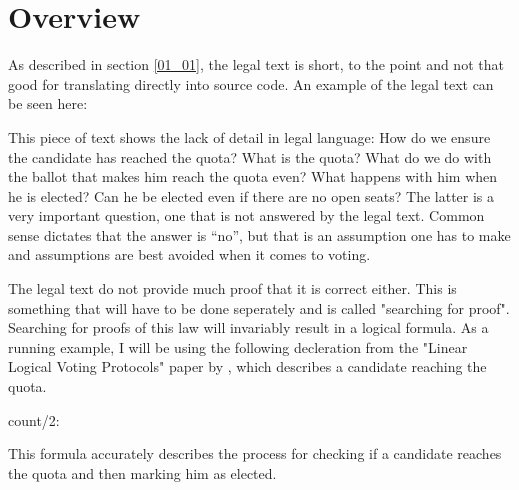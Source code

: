 \chapter{Overview}
\label{02}

As described in section \ref{01_01}, the legal text is short, to the point and not that good for translating directly into source code. An example of the legal text can be seen here:


This piece of text shows the lack of detail in legal language: How do we ensure the candidate has reached the quota? What is the quota? What do we do with the ballot that makes him reach the quota even? What happens with him when he is elected? Can he be elected even if there are no open seats? The latter is a very important question, one that is not answered by the legal text. Common sense dictates that the answer is “no”, but that is an assumption one has to make and assumptions are best avoided when it comes to voting.

The legal text do not provide much proof that it is correct either. This is something that will have to be done seperately and is called "searching for proof". Searching for proofs of this law will invariably result in a logical formula. As a running example, I will be using the following decleration from the "Linear Logical Voting Protocols"\cite{Deyoung11} paper by \citeauthor{Deyoung11}, which describes a candidate reaching the quota.

\begin{textoform}
	count/2: \\
\end{textoform}

This formula accurately describes the process for checking if a candidate reaches the quota and then marking him as elected.

